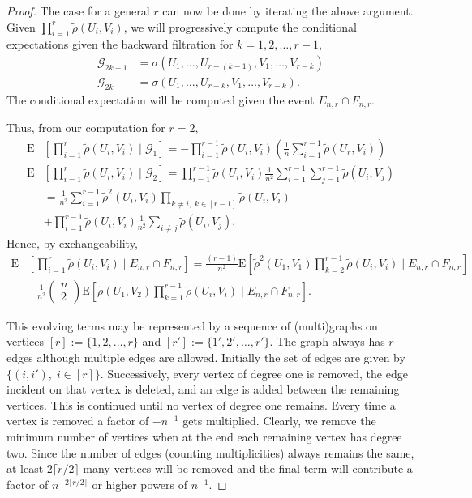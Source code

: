 \documentclass{amsart}
\newcommand{\combi}[2]{\begin{pmatrix}#1 \\ #2 \end{pmatrix}}
\newcommand{\E}{\mathrm{E}}
\begin{document}
{\begin{proof}
The case for a general $r$ can now be done by iterating the above argument. Given $\prod_{i=1}^r \tilde{\rho}(U_i, V_i)$, we will progressively compute the conditional expectations given the backward filtration for $k=1,2,\ldots, r-1$, 
\[
\begin{split}
\mathcal{G}_{2k-1}&=\sigma\left( U_1, \ldots, U_{r-(k-1)}, V_1, \ldots, V_{r-k}\right)\\
\mathcal{G}_{2k}&=\sigma\left( U_1, \ldots, U_{r-k}, V_1, \ldots, V_{r-k}\right).
\end{split}
\]
The conditional expectation will be computed given the event $E_{n,r} \cap F_{n,r}$.  

Thus, from our computation for $r=2$,  
\[
\begin{split}
\E&\left[ \prod_{i=1}^r \tilde{\rho}(U_i, V_i) \mid \mathcal{G}_1 \right]=-\prod_{i=1}^{r-1} \tilde{\rho}(U_i, V_i) \left( \frac{1}{n} \sum_{i=1}^{r-1} \tilde{\rho}(U_r, V_i) \right)\\
\E&\left[ \prod_{i=1}^r \tilde{\rho}(U_i, V_i) \mid \mathcal{G}_2 \right]=\prod_{i=1}^{r-1} \tilde{\rho}(U_i, V_i) \frac{1}{n^2} \sum_{i=1}^{r-1} \sum_{j=1}^{r-1} \tilde{\rho}(U_i, V_j)\\
&= \frac{1}{n^2} \sum_{i=1}^{r-1} \tilde{\rho}^2(U_i, V_i) \prod_{k\neq i,\; k\in [r-1]} \tilde{\rho}(U_i, V_i)  \\
&+ \prod_{i=1}^{r-1} \tilde{\rho}(U_i, V_i) \frac{1}{n^2} \sum_{i\neq j} \tilde{\rho}(U_i, V_j).
\end{split}
\]
Hence, by exchangeability, 
\[
\begin{split}
\E&\left[ \prod_{i=1}^r \tilde{\rho}(U_i, V_i) \mid E_{n,r} \cap F_{n,r} \right]= \frac{(r-1)}{n^2} \E\left[ \tilde{\rho}^2(U_1, V_1) \prod_{k=2}^{r-1} \tilde{\rho}(U_i, V_i) \mid E_{n,r} \cap F_{n,r} \right]\\
&+ \frac{1}{n^2} \combi{n}{2} \E\left[ \tilde{\rho}(U_1, V_2)\prod_{k=1}^{r-1} \tilde{\rho}(U_i, V_i) \mid E_{n,r} \cap F_{n,r} \right].
\end{split}
\]

This evolving terms may be represented by a sequence of (multi)graphs on vertices $[r]:=\{1,2,\ldots, r\}$ and $[r']:=\{1', 2', \ldots, r'\}$. The graph always has $r$ edges although multiple edges are allowed. Initially the set of edges are given by $\{(i,i'),\; i \in [r]\}$. Successively, every vertex of degree one is removed, the edge incident on that vertex is deleted, and an edge is added between the remaining vertices. This is continued until no vertex of degree one remains. Every time a vertex is removed a factor of $-n^{-1}$ gets multiplied. Clearly, we remove the minimum number of vertices when at the end each remaining vertex has degree two. Since the number of edges (counting multiplicities) always remains the same, at least $2\lceil r/2 \rceil$ many vertices will be removed and the final term will contribute a factor of $n^{-2\lceil r/2 \rceil}$ or higher powers of $n^{-1}$. 


\end{proof}}
\end{document}
